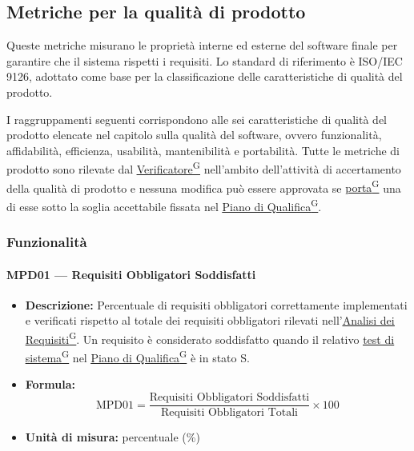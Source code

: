 \documentclass[a4paper,12pt]{article}
\providecommand{\glslink}[2]{\href{https://alittlebyte-19.github.io/Documentazione/glossario.html\#gls-#1}{\underline{#2}\textsuperscript{\scriptsize G}}}
\begin{document}
\subsection{Metriche per la qualità di prodotto}
Queste metriche misurano le proprietà interne ed esterne del software finale per garantire che il sistema rispetti i requisiti. Lo standard di riferimento è ISO/IEC 9126, adottato come base per la classificazione delle caratteristiche di qualità del prodotto.

I raggruppamenti seguenti corrispondono alle sei caratteristiche di qualità del prodotto elencate nel capitolo sulla qualità del software, ovvero funzionalità, affidabilità, efficienza, usabilità, mantenibilità e portabilità. Tutte le metriche di prodotto sono rilevate dal \glslink{verificatore}{Verificatore} nell'ambito dell'attività di accertamento della qualità di prodotto e nessuna modifica può essere approvata se \glslink{porta}{porta} una di esse sotto la soglia accettabile fissata nel \glslink{piano-di-qualifica}{Piano di Qualifica}.

\subsubsection{Funzionalità}

\paragraph{MPD01 --- Requisiti Obbligatori Soddisfatti}
\begin{itemize}
    \item \textbf{Descrizione:} Percentuale di requisiti obbligatori correttamente implementati e verificati rispetto al totale dei requisiti obbligatori rilevati nell'\glslink{analisi-dei-requisiti-adr}{Analisi dei Requisiti}. Un requisito è considerato soddisfatto quando il relativo \glslink{test-di-sistema}{test di sistema} nel \glslink{piano-di-qualifica}{Piano di Qualifica} è in stato S.
    \item \textbf{Formula:}
    $$\text{MPD01} = \frac{\text{Requisiti Obbligatori Soddisfatti}}{\text{Requisiti Obbligatori Totali}} \times 100$$
    \item \textbf{Unità di misura:} percentuale (\%)
\end{itemize}
\end{document}
